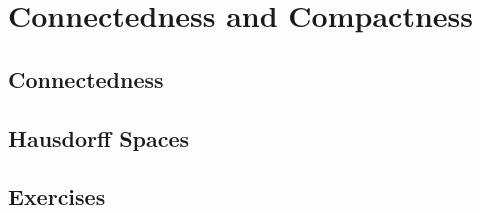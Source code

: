 \chapter{Connectedness and Compactness}

\section{Connectedness}













\section{Hausdorff Spaces}


\addtocounter{section}{1}

\section{Exercises}

